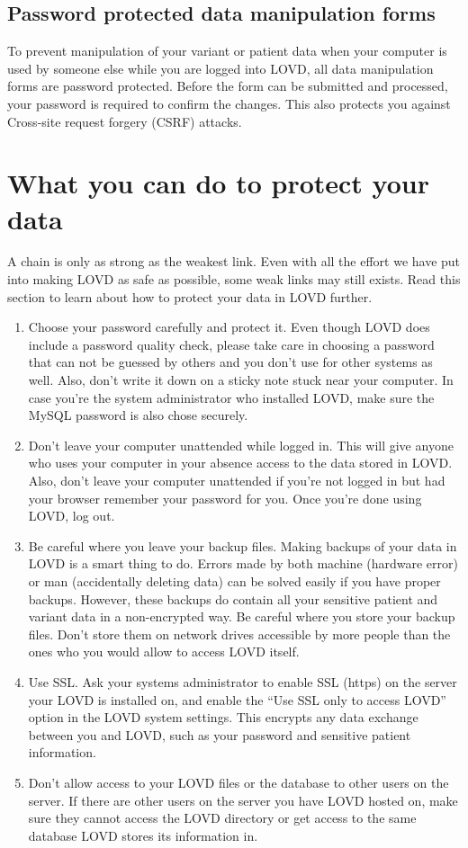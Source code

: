 \documentclass[a4paper,oneside,openany,12pt]{memoir}
\begin{document}
\subsection{Password protected data manipulation forms}
To prevent manipulation of your variant or patient data when your computer is used by someone else while you are logged into LOVD, all data manipulation forms are password protected.
Before the form can be submitted and processed, your password is required to confirm the changes.
This also protects you against Cross-site request forgery (CSRF) attacks.





\pagebreak
\section{What you can do to protect your data}
A chain is only as strong as the weakest link.
Even with all the effort we have put into making LOVD as safe as possible, some weak links may still exists.
Read this section to learn about how to protect your data in LOVD further.
\begin{enumerate}
  \item Choose your password carefully and protect it.
    Even though LOVD does include a password quality check, please take care in choosing a password that can not be guessed by others and you don't use for other systems as well.
    Also, don't write it down on a sticky note stuck near your computer.
    In case you're the system administrator who installed LOVD, make sure the MySQL password is also chose securely.
  \item Don't leave your computer unattended while logged in.
    This will give anyone who uses your computer in your absence access to the data stored in LOVD.
    Also, don't leave your computer unattended if you're not logged in but had your browser remember your password for you.
    Once you're done using LOVD, log out.
  \item Be careful where you leave your backup files.
    Making backups of your data in LOVD is a smart thing to do.
    Errors made by both machine (hardware error) or man (accidentally deleting data) can be solved easily if you have proper backups.
    However, these backups do contain all your sensitive patient and variant data in a non-encrypted way.
    Be careful where you store your backup files.
    Don't store them on network drives accessible by more people than the ones who you would allow to access LOVD itself.
  \item Use SSL.
    Ask your systems administrator to enable SSL (https) on the server your LOVD is installed on, and enable the ``Use SSL only to access LOVD'' option in the LOVD system settings.
    This encrypts any data exchange between you and LOVD, such as your password and sensitive patient information.
  \item Don't allow access to your LOVD files or the database to other users on the server.
    If there are other users on the server you have LOVD hosted on, make sure they cannot access the LOVD directory or get access to the same database LOVD stores its information in.
\end{enumerate}
\end{document}
